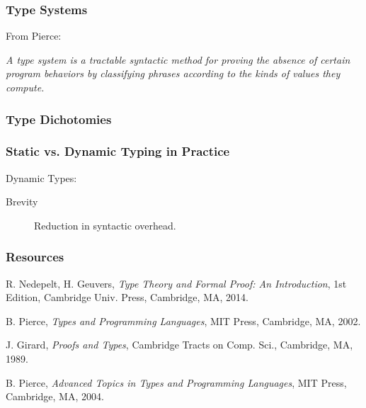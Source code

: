 \documentclass{beamer}
\begin{document}
\begin{frame}
\frametitle{Type Systems}
From Pierce:
\vspace{20pt}

\textit{A type system is a tractable syntactic method for proving the absence of
  certain program behaviors by classifying phrases according to the kinds of
  values they compute.}

\end{frame}

\begin{frame}
\frametitle{Type Dichotomies}
\end{frame}

\begin{frame}
  \frametitle{Static vs. Dynamic Typing in Practice}
  Dynamic Types:
\begin{description}
\item[Brevity] Reduction in syntactic overhead.
\item[]
\end{description}
\end{frame}

\begin{frame}
\frametitle{Resources}
\begin{thebibliography}{9}

 R. Nedepelt, H. Geuvers, \emph{Type Theory and Formal Proof: An
    Introduction}, 1st Edition, Cambridge Univ. Press, Cambridge, MA, 2014.

 B. Pierce, \emph{Types and Programming Languages}, MIT
  Press, Cambridge, MA, 2002.

 J. Girard, \emph{Proofs and Types}, Cambridge Tracts on
  Comp. Sci., Cambridge, MA, 1989.

 B. Pierce, \emph{Advanced Topics in Types and Programming
    Languages}, MIT Press, Cambridge, MA, 2004.


\end{thebibliography}
\end{frame}
\end{document}
